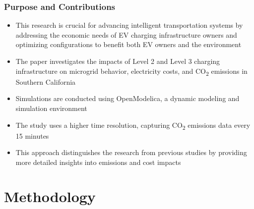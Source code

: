 \documentclass[aspectratio=169, 8 pt]{beamer}
\begin{document}
%	
	\begin{frame}
		\frametitle{Purpose and Contributions}
		\begin{itemize} \LARGE
			\item This research is crucial for advancing intelligent transportation systems by addressing the economic needs of EV charging infrastructure owners and optimizing configurations to benefit both EV owners and the environment
			\item The paper investigates the impacts of Level 2 and Level 3 charging infrastructure on microgrid behavior, electricity costs, and CO\textsubscript{2} emissions in Southern California
			\item Simulations are conducted using OpenModelica, a dynamic modeling and simulation environment
			\item The study uses a higher time resolution, capturing CO\textsubscript{2} emissions data every 15 minutes
			\item This approach distinguishes the research from previous studies by providing more detailed insights into emissions and cost impacts
		\end{itemize}
		
	\end{frame}
	
	\section{Methodology}
	
\end{document}
